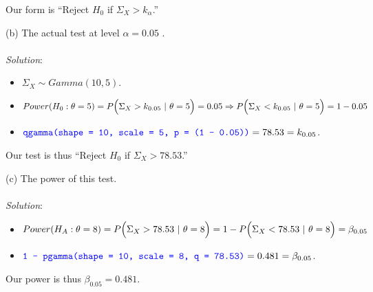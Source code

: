\documentclass[12pt]{article}
\newcommand{\XBB}{\color{blue}}
\newcommand{\ds}{\displaystyle}
\begin{document}
\noindent
Our form is ``Reject $ H_{0} $ if $ \Sigma_{X} > k_{\alpha} $.''

\vspace{2.5mm}

(b) The actual test at level $ \alpha = 0.05$ . \\
\vspace{2.5mm} \\
\textit{Solution}:
\vspace{2.5mm} \\ 

\begin{itemize}
    \item $ \ds \Sigma_{X} \sim Gamma(10, 5) $.
    \item $ \ds Power(H_{0} : \theta = 5) = P \Bigl(\Sigma_{X} > k_{0.05} \ | \ \theta = 5 \Bigr) = 0.05 \Rightarrow P \Bigl(\Sigma_{X} < k_{0.05} \ | \ \theta = 5 \Bigr) = 1 - 0.05 $
    \item $ \ds {\XBB \texttt{qgamma(shape = 10, scale = 5, p = (1 - 0.05))}} = 78.53 = k_{0.05} $.
\end{itemize}

\noindent
Our test is thus ``Reject $ H_{0} $ if $ \Sigma_{X} > 78.53 $.'' \\

\vspace{2.5mm}

\newpage

(c) The power of this test. \\
\vspace{2.5mm} \\
\textit{Solution}:
\vspace{2.5mm} \\ 

\begin{itemize}
    \item $ \ds Power(H_{A} : \theta = 8) = P \Bigl(\Sigma_{X} > 78.53 \ | \ \theta = 8 \Bigr) = 1 - P \Bigl(\Sigma_{X} < 78.53 \ | \ \theta = 8 \Bigr) = \beta_{0.05} $
    \item $ \ds {\XBB \texttt{1 - pgamma(shape = 10, scale = 8, q = 78.53)}} = 0.481 = \beta_{0.05} $.
\end{itemize}

\noindent
Our power is thus $ \beta_{0.05} = 0.481 $. \\
\end{document}
